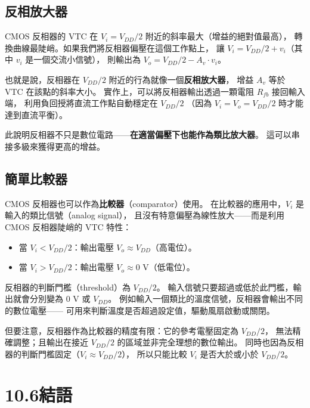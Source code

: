 \documentclass[12pt]{article}
\begin{document}
\subsection*{反相放大器}

CMOS 反相器的 VTC 在 $V_i = V_{DD}/2$ 附近的斜率最大（增益的絕對值最高），
轉換曲線最陡峭。如果我們將反相器偏壓在這個工作點上，
讓 $V_i = V_{DD}/2 + v_i$（其中 $v_i$ 是一個交流小信號），
則輸出為 $V_o = V_{DD}/2 - A_v \cdot v_i$。

也就是說，反相器在 $V_{DD}/2$ 附近的行為就像一個\textbf{反相放大器}，
增益 $A_v$ 等於 VTC 在該點的斜率大小。
實作上，可以將反相器輸出透過一顆電阻 $R_{fb}$ 接回輸入端，
利用負回授將直流工作點自動穩定在 $V_{DD}/2$
（因為 $V_i = V_o = V_{DD}/2$ 時才能達到直流平衡）。

此說明反相器不只是數位電路——\textbf{在適當偏壓下也能作為類比放大器}。
這可以串接多級來獲得更高的增益。

\subsection*{簡單比較器}

CMOS 反相器也可以作為\textbf{比較器}（comparator）使用。
在比較器的應用中，$V_i$ 是輸入的類比信號（analog signal），
且沒有特意偏壓為線性放大——而是利用 CMOS 反相器陡峭的 VTC 特性：

\begin{itemize}[leftmargin=2.2em,itemsep=2pt]
  \item 當 $V_i < V_{DD}/2$：輸出電壓 $V_o \approx V_{DD}$（高電位）。
  \item 當 $V_i > V_{DD}/2$：輸出電壓 $V_o \approx 0$ V（低電位）。
\end{itemize}

反相器的判斷門檻（threshold）為 $V_{DD}/2$。
輸入信號只要超過或低於此門檻，輸出就會分別變為 0 V 或 $V_{DD}$。
例如輸入一個類比的溫度信號，反相器會輸出不同的數位電壓——
可用來判斷溫度是否超過設定值，驅動風扇啟動或關閉。

但要注意，反相器作為比較器的精度有限：它的參考電壓固定為 $V_{DD}/2$，
無法精確調整；且輸出在接近 $V_{DD}/2$ 的區域並非完全理想的數位輸出。
同時也因為反相器的判斷門檻固定（$V_i \approx V_{DD}/2$），
所以只能比較 $V_i$ 是否大於或小於 $V_{DD}/2$。

\section*{10.6\quad 結語}
\end{document}
